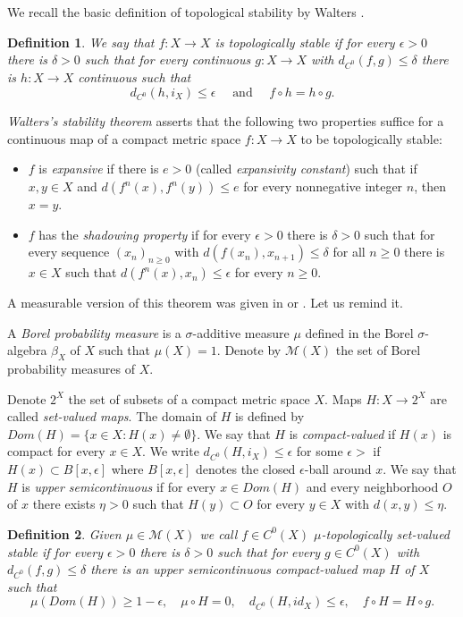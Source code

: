 \documentclass[11pt,letterpaper]{amsart}
\theoremstyle{plain}
\newtheorem{definition}{Definition}
\begin{document}
We recall the basic definition of topological stability by Walters \cite{w}.


\begin{definition}
We say that $f:X\to X$
is {\em topologically stable} if for every $\epsilon>0$ there is $\delta>0$ such that for every continuous $g:X\to X$ with $d_{C^0}(f,g)\leq\delta$ there is $h:X\to X$ continuous such that
$$
d_{C^0}(h,i_X)\leq\epsilon\quad\mbox{ and }\quad f\circ h=h\circ g.
$$
\end{definition}


{\em Walters's stability theorem} \cite{w} asserts that the following two properties suffice for a continuous map of a compact metric space $f:X\to X$ to be topologically stable:

\begin{itemize}
\item
$f$ is {\em expansive} if there is $e>0$ (called {\em expansivity constant}) such that if $x,y\in X$ and $d(f^n(x),f^n(y))\leq e$ for every nonnegative integer $n$, then $x=y$.

\item
$f$ has the {\em shadowing property} if for every $\epsilon>0$ there is $\delta>0$ such that for every sequence $(x_n)_{n\geq0}$ with $d(f(x_n),x_{n+1})\leq\delta$ for all $n\geq0$ there is $x\in X$ such that
$d(f^n(x),x_n)\leq \epsilon$ for every $n\geq 0$.
\end{itemize}


A measurable version of this theorem was given in \cite{lm} or \cite{lr}.
Let us remind it.

A {\em Borel probability measure} is a $\sigma$-additive measure $\mu$ defined in the Borel $\sigma$-algebra $\beta_X$ of $X$ such that $\mu(X)=1$. Denote by
$\mathcal{M}(X)$ the set of Borel probability measures of $X$.

Denote $2^X$ the set of subsets of a compact metric space $X$.
Maps $H:X\to 2^X$ are called {\em set-valued maps}.
The domain of $H$ is defined by $Dom(H)=\{x\in X:H(x)\neq\emptyset\}$.
We say that $H$ is {\em compact-valued} if $H(x)$ is compact for every $x\in X$.
We write $d_{C^0}(H,i_X)\leq \epsilon$ for some $\epsilon>$ if $H(x)\subset B[x,\epsilon]$ where $B[x,\epsilon]$ denotes the closed $\epsilon$-ball around $x$.
We say that $H$ is {\em upper semicontinuous} if for every $x\in Dom(H)$ and every neighborhood $O$ of $x$ there exists $\eta>0$ such that
$H(y)\subset O$ for every $y\in X$ with $d(x,y)\leq \eta$.

\begin{definition}
Given $\mu\in\mathcal{M}(X)$ we call $f\in C^0(X)$
{\em $\mu$-topologically set-valued stable} if for every $\epsilon>0$ there is $\delta>0$ such that for every $g\in C^0(X)$ with $d_{C^0}(f,g)\leq\delta$ there is
an upper semicontinuous compact-valued map $H$ of $X$ such that
$$
\mu(Dom(H))\geq 1-\epsilon,\quad \mu\circ H=0,\quad d_{C^0}(H,id_X)\leq \epsilon, \quad f\circ H=H\circ g.
$$
\end{definition}
\end{document}
